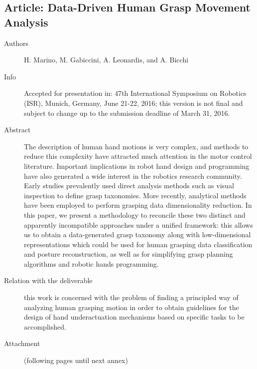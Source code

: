\documentclass[a4paper,11pt,pdf]{pacmanreport}
\begin{document}

\subsection{Article: Data-Driven Human Grasp Movement Analysis}
\label{ann:DataDrivenHumanGraspMovementAnalysis}
\begin{description}
    \item[Authors] H. Marino, M. Gabiccini, A. Leonardis, and A. Bicchi
    \item[Info] Accepted for presentation in: 47th International Symposium on Robotics (ISR), Munich, Germany, June 21-22, 2016; this version is not final and subject to change up to the submission deadline of March 31, 2016.
    \item[Abstract] The description of human hand motions is very complex, and methods to reduce this complexity have attracted much attention in the motor control literature. Important implications in robot hand design and programming have also generated a wide interest in the robotics research community.
    Early studies prevalently used direct analysis methods such as visual inspection to define grasp taxonomies. More recently, analytical methods have been employed to perform grasping data dimensionality reduction. In this paper, we present a methodology to reconcile these two distinct and apparently incompatible approaches under a unified framework: this allows us to obtain a data-generated grasp taxonomy along with low-dimensional representations which could be used for human grasping data classification and posture reconstruction, as well as for simplifying grasp planning algorithms and robotic hands programming.
    \item[Relation with the deliverable] this work is concerned with the problem of finding a principled way of analyzing human grasping motion in order to obtain guidelines for the design of hand underactuation mechanisms based on specific tasks to be accomplished.
    \item[Attachment] (following pages until next annex)
\end{description}

\end{document}
